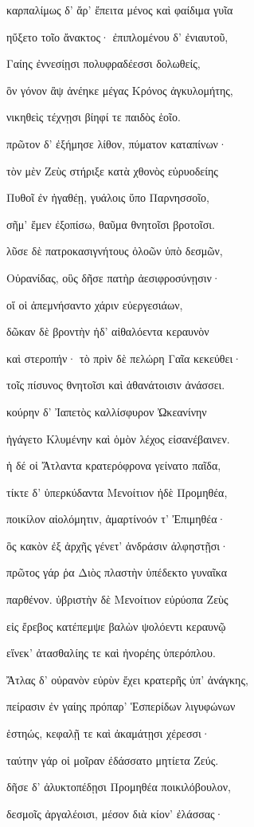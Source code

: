 \begin{pages}
\begin{Leftside}
καρπαλίμως δ' ἄρ' ἔπειτα μένος καὶ φαίδιμα γυῖα

ηὔξετο τοῖο ἄνακτος· ἐπιπλομένου δ' ἐνιαυτοῦ, 

Γαίης ἐννεσίῃσι πολυφραδέεσσι δολωθείς, 

ὃν γόνον ἂψ ἀνέηκε μέγας Κρόνος ἀγκυλομήτης,  

νικηθεὶς τέχνῃσι βίηφί τε παιδὸς ἑοῖο.

πρῶτον δ' ἐξήμησε λίθον, πύματον καταπίνων·

τὸν μὲν Ζεὺς στήριξε κατὰ χθονὸς εὐρυοδείης

Πυθοῖ ἐν ἠγαθέῃ, γυάλοις ὕπο Παρνησσοῖο, 

σῆμ' ἔμεν ἐξοπίσω, θαῦμα θνητοῖσι βροτοῖσι.  

λῦσε δὲ πατροκασιγνήτους ὀλοῶν ὑπὸ δεσμῶν, 

Οὐρανίδας, οὓς δῆσε πατὴρ ἀεσιφροσύνῃσιν· 

οἵ οἱ ἀπεμνήσαντο χάριν εὐεργεσιάων,

δῶκαν δὲ βροντὴν ἠδ' αἰθαλόεντα κεραυνὸν

καὶ στεροπήν· τὸ πρὶν δὲ πελώρη Γαῖα κεκεύθει·  

τοῖς πίσυνος θνητοῖσι καὶ ἀθανάτοισιν ἀνάσσει.

κούρην δ' Ἰαπετὸς καλλίσφυρον Ὠκεανίνην

ἠγάγετο Κλυμένην καὶ ὁμὸν λέχος εἰσανέβαινεν.

ἡ δέ οἱ Ἄτλαντα κρατερόφρονα γείνατο παῖδα,

τίκτε δ' ὑπερκύδαντα Μενοίτιον ἠδὲ Προμηθέα, 

ποικίλον αἰολόμητιν, ἁμαρτίνοόν τ' Ἐπιμηθέα· 

ὃς κακὸν ἐξ ἀρχῆς γένετ' ἀνδράσιν ἀλφηστῇσι· 

πρῶτος γάρ ῥα Διὸς πλαστὴν ὑπέδεκτο γυναῖκα

παρθένον. ὑβριστὴν δὲ Μενοίτιον εὐρύοπα Ζεὺς

εἰς ἔρεβος κατέπεμψε βαλὼν ψολόεντι κεραυνῷ  

εἵνεκ' ἀτασθαλίης τε καὶ ἠνορέης ὑπερόπλου.

Ἄτλας δ' οὐρανὸν εὐρὺν ἔχει κρατερῆς ὑπ' ἀνάγκης, 

πείρασιν ἐν γαίης πρόπαρ' Ἑσπερίδων λιγυφώνων 

ἑστηώς, κεφαλῇ τε καὶ ἀκαμάτῃσι χέρεσσι· 

ταύτην γάρ οἱ μοῖραν ἐδάσσατο μητίετα Ζεύς. 

δῆσε δ' ἀλυκτοπέδῃσι Προμηθέα ποικιλόβουλον,

δεσμοῖς ἀργαλέοισι, μέσον διὰ κίον' ἐλάσσας· 


\end{Leftside}
\end{pages}
